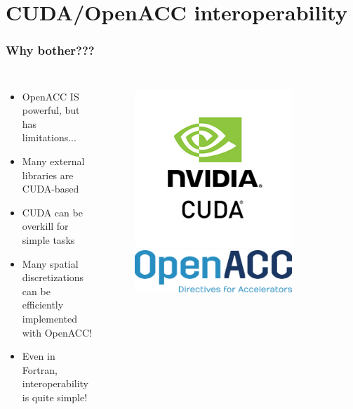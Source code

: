 \section{CUDA/OpenACC interoperability}

\begin{frame}
	\frametitle{Why bother???}
	\begin{columns}
		\begin{itemize}
			\item OpenACC IS powerful, but has limitations...
			\item Many external libraries are CUDA-based
			\item CUDA can be overkill for simple tasks
			\item Many spatial discretizations can be efficiently implemented with OpenACC!
			\item Even in Fortran, interoperability is quite simple!
		\end{itemize}
		\begin{figure}
			\centering
			\includegraphics[width=0.8\textwidth]{images/NVIDIACuda_Logo.jpg}
			\includegraphics[width=0.8\textwidth]{images/OpenACC-logo.png}
		\end{figure}

	\end{columns}
\end{frame}

